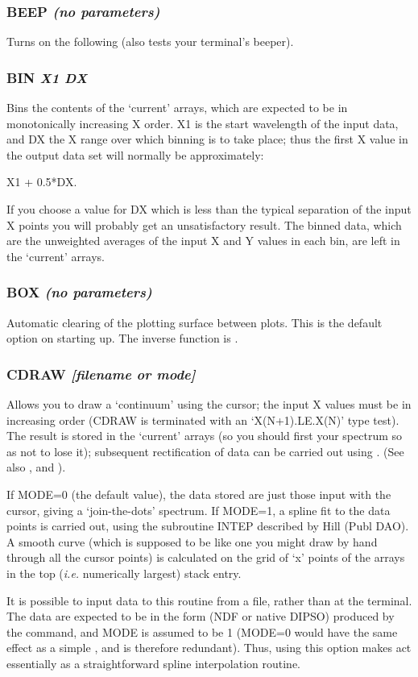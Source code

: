 \documentclass[twoside,11pt,noabs,nolof]{starlink}
\providecommand{\dipcom}[3]{\subsubsection*{\label{COM:#1}\xlabel{COM:#1}\textbf{#1} \emph{#2}}}
\begin{document}
\dipcom{BEEP}{(no parameters)}{Causes a beep after every error}
Turns on the   following   (also tests your terminal's beeper).

\dipcom{BIN}{X1 DX}{Bins the contents of the current arrays}
Bins the contents of the `current' arrays, which are expected to be in
monotonically increasing X order. X1 is the start wavelength of the
input data, and DX the X range over which binning is to take place;
thus the first X value in the output data set will normally be
approximately:

\begin{terminalv}
X1 + 0.5*DX.
\end{terminalv}

If you choose a value for DX which is less than the typical separation
of the input X points you will probably get an unsatisfactory result.
The binned data, which are the unweighted averages of the input X and
Y values in each bin, are left in the `current' arrays.

\dipcom{BOX}{(no parameters)}{Causes the plotting surface to be cleared between plots}
Automatic clearing of the plotting surface between plots. This is the
default option on starting up. The inverse function is .

\dipcom{CDRAW}{[filename or mode]}{Draws a 'continuum' using the cursor or by fitting data in a file}
Allows you to draw a `continuum' using the cursor; the input X values
must be in increasing order (CDRAW is terminated with an
`X(N+1).LE.X(N)' type test). The result is stored in the `current'
arrays (so you should first   your spectrum so as not to lose it);
subsequent rectification of data can be carried out using .  (See
also ,    and ).

If MODE=0 (the default value), the data stored are just those input
with the cursor, giving a `join-the-dots' spectrum. If MODE=1, a
spline fit to the data points is carried out, using the subroutine
INTEP described by Hill (Publ DAO). A smooth curve (which is supposed
to be like one you might draw by hand through all the cursor points)
is calculated on the grid of `x' points of the arrays in the top (\emph{i.e.} numerically largest) stack entry.

It is possible to input data to this routine from a file, rather than at the
terminal. The data are expected to be in the form (NDF or native DIPSO) produced
by the   command, and MODE is assumed to be 1 (MODE=0 would have the
same effect as a simple ,  and is therefore redundant). Thus, using this
option makes   act essentially as a straightforward spline interpolation
routine.
\end{document}
